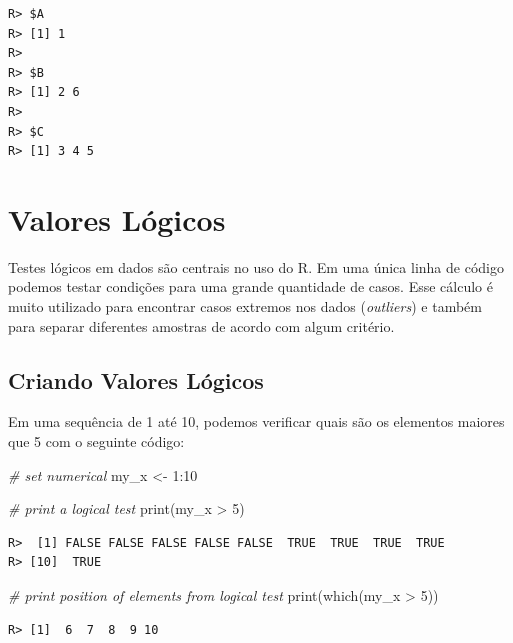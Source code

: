 \documentclass[
  11pt,
]{book}
\newenvironment{Shaded}{\begin{snugshade}}{\end{snugshade}}
\newcommand{\CommentTok}[1]{\textcolor[rgb]{0.37,0.37,0.37}{\textit{#1}}}
\newcommand{\DecValTok}[1]{\textcolor[rgb]{0.06,0.06,0.06}{#1}}
\newcommand{\FunctionTok}[1]{\textcolor[rgb]{0,0,0}{#1}}
\newcommand{\NormalTok}[1]{#1}
\newcommand{\OtherTok}[1]{\textcolor[rgb]{0.37,0.37,0.37}{#1}}
\newcommand{\SpecialCharTok}[1]{\textcolor[rgb]{0,0,0}{#1}}
\begin{document}
\begin{verbatim}
R> $A
R> [1] 1
R> 
R> $B
R> [1] 2 6
R> 
R> $C
R> [1] 3 4 5
\end{verbatim}

\hypertarget{valores-luxf3gicos}{%
\section{Valores Lógicos}\label{valores-luxf3gicos}}

Testes lógicos em dados são centrais no uso do R. Em uma única linha de código podemos testar condições para uma grande quantidade de casos. Esse cálculo é muito utilizado para encontrar casos extremos nos dados (\emph{outliers}) e também para separar diferentes amostras de acordo com algum critério.

\hypertarget{criando-valores-luxf3gicos}{%
\subsection{Criando Valores Lógicos}\label{criando-valores-luxf3gicos}}

Em uma sequência de 1 até 10, podemos verificar quais são os elementos maiores que 5 com o seguinte código: 

\begin{Shaded}
\begin{Highlighting}[]
\CommentTok{\# set numerical}
\NormalTok{my\_x }\OtherTok{\textless{}{-}} \DecValTok{1}\SpecialCharTok{:}\DecValTok{10}

\CommentTok{\# print a logical test}
\FunctionTok{print}\NormalTok{(my\_x }\SpecialCharTok{\textgreater{}} \DecValTok{5}\NormalTok{)}
\end{Highlighting}
\end{Shaded}

\begin{verbatim}
R>  [1] FALSE FALSE FALSE FALSE FALSE  TRUE  TRUE  TRUE  TRUE
R> [10]  TRUE
\end{verbatim}

\begin{Shaded}
\begin{Highlighting}[]
\CommentTok{\# print position of elements from logical test}
\FunctionTok{print}\NormalTok{(}\FunctionTok{which}\NormalTok{(my\_x }\SpecialCharTok{\textgreater{}} \DecValTok{5}\NormalTok{))}
\end{Highlighting}
\end{Shaded}

\begin{verbatim}
R> [1]  6  7  8  9 10
\end{verbatim}
\end{document}
